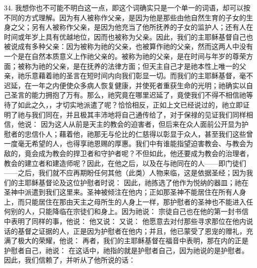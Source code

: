 34. 我想你也不可能不明白这一点，即这个词确实只是一个单一的词语，却可以按不同的方式理解。因为有人被称作父亲，是因为他是那些由他自然生育的子女的生身之父；另有人被称作父亲，是因为他充当了他所抚养的子女的监护人；还有人在时间或年岁上具有优越地位，因而也被称为父亲。因此，我们的主耶稣基督自己也被说成有多种父亲：因为被称为祂的父亲，也被算作祂的父亲，然而这两人中没有一个是在自然本质意义上作祂父亲的。被称为祂的父亲，是在时间与年岁的尊荣方面；被称为祂的父亲，是在抚养的法律方面；但天主自己才是祂本性上唯一的父亲，祂乐意藉着祂的圣言在短时间内向我们彰显一切。而我们的主耶稣基督，毫不迟延，在一年之内便使众多病人恢复健康，并使死者重获生命的光明；祂确实以自己圣言的能力拥抱了万有。那么，祂究竟在哪里迟延了，竟使我们不得不相信祂等待了如此之久，，才切实地派遣了呢？恰恰相反，正如上文已经说过的，祂立即证明了祂与我们同在，并且极其丰沛地将自己通传给了，对于保禄的见证我们同样相信，他说： 因为这人从前是天主的教会的迫害者，但后来在众人面前公开显为护慰者的忠信仆人；藉着他，祂那无与伦比的仁慈得以彰显于众人，甚至我们这些曾一度毫无希望的人，也得享祂恩赐的厚惠。我们中有谁能指望迫害教会、与教会为敌的，竟会成为教会的捍卫者和守护者呢？不但如此，他还要成为教会的治理者，教会的建立者和建造师呢？因此，在他之后，以及在与祂同在的人——即门徒们——之后，我们就不应再期盼任何其他（此类）人物来临，这是依据圣经；因为我们的主耶稣基督论及这位护慰者时说： 因此，祂拣选了他作为悦纳的器皿；祂在圣神中派遣到我们这里来。圣神被倾注在他内；正如那圣神不能居住在所有人身上，而只能居住在那由天主之母所生的人身上一样，那护慰者的圣神也不能进入任何别的人，只能降临在宗徒们和身上。因为祂说： 宗徒自己也在他的第一封书信中表明了同样的事，他说： 他又说： 又说：  他愿意去对付那些寻求那位在他内说话的基督之证据的人，正是因为护慰者在他内；并且，他已蒙受了恩宠的赠礼，充满了极大的荣耀，他说： 再者，我们的主耶稣基督在福音中表明，那在内的正是护慰者自己，祂说： 在这话中，祂指的就是护慰者自己，因为祂说的是护慰者。因此，我们信赖了，并听从了他所说的话： 